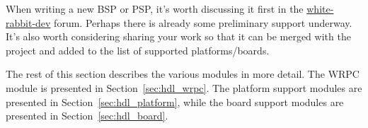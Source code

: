 When writing a new BSP or PSP, it's worth discussing it first in the
\href{https://forums.ohwr.org/c/white-rabbit-dev}{white-rabbit-dev} forum.
Perhaps there is already some preliminary support underway. It's also worth considering
sharing your work so that it can be merged with the project and added to the list of supported
platforms/boards.

The rest of this section describes the various modules in more detail. The WRPC module is presented
in Section~\ref{sec:hdl_wrpc}. The platform support modules are presented in
Section~\ref{sec:hdl_platform}, while the board support modules are presented in
Section~\ref{sec:hdl_board}.

